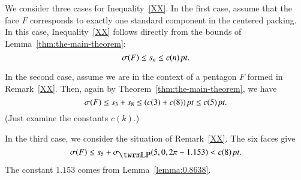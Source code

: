 

We consider three cases for Inequality~\ref{XX}. In the
first case, assume that the face $F$ corresponds to exactly one
standard component in the centered packing. In this case,
Inequality~\ref{XX} follows directly from the bounds of
Lemma~\ref{thm:the-main-theorem}:
    $$\sigma(F)\le s_n \le c(n)\,\hbox{\it pt}.$$

In the second case, assume we are in the context of a pentagon $F$
formed in Remark~\ref{XX}.  Then, again by
Theorem~\ref{thm:the-main-theorem}, we have
$$\sigma(F) \le s_3+s_8\le (c(3)+c(8))\,\hbox{\it pt} \le c(5)\,\hbox{\it pt}.$$
(Just examine the constants $c(k)$.)

In the third case, we consider the situation of 
Remark~\ref{XX}.  The six faces give
$$\sigma(F)\le s_5+\sLP(5,0,2\pi-1.153)< c(8)\,\pt.$$
The constant $1.153$ comes from Lemma~\ref{lemma:0.8638}.


